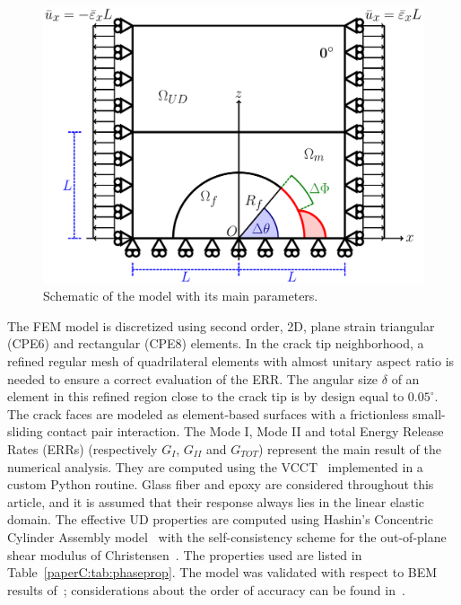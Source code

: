 \begin{figure}[!htb]
\centering
        \includegraphics[width=\textwidth]{paperC/RUC.pdf}
\caption{Schematic of the model with its main parameters.}\label{paperC:fig:modelschem}
\end{figure}

The FEM model is discretized using second order, 2D, plane strain triangular (CPE6) and rectangular (CPE8) elements. In the crack tip neighborhood, a refined regular mesh of quadrilateral elements with almost unitary aspect ratio is needed to ensure a correct evaluation of the ERR. The angular size $\delta$ of an element in this refined region close to the crack tip is by design equal to $0.05^{\circ}$. The crack faces are modeled as element-based surfaces with a frictionless small-sliding contact pair interaction. The Mode I, Mode II and total Energy Release Rates (ERRs) (respectively $G_{I}$, $G_{II}$ and $G_{TOT}$) represent the main result of the numerical analysis. They are computed using the VCCT~\cite{Krueger2004} implemented in a custom Python routine. Glass fiber and epoxy are considered throughout this article, and it is assumed that their response always lies in the linear elastic domain. The effective UD properties are computed using Hashin's Concentric Cylinder Assembly model~\cite{Hashin1983} with the self-consistency scheme for the out-of-plane shear modulus of Christensen~\cite{Christensen1979}. The properties used are listed in Table~\ref{paperC:tab:phaseprop}. The model was validated with respect to BEM results of~\cite{Paris2007,Sandino2016}; considerations about the order of accuracy can be found in~\cite{DiStasio2019}.


